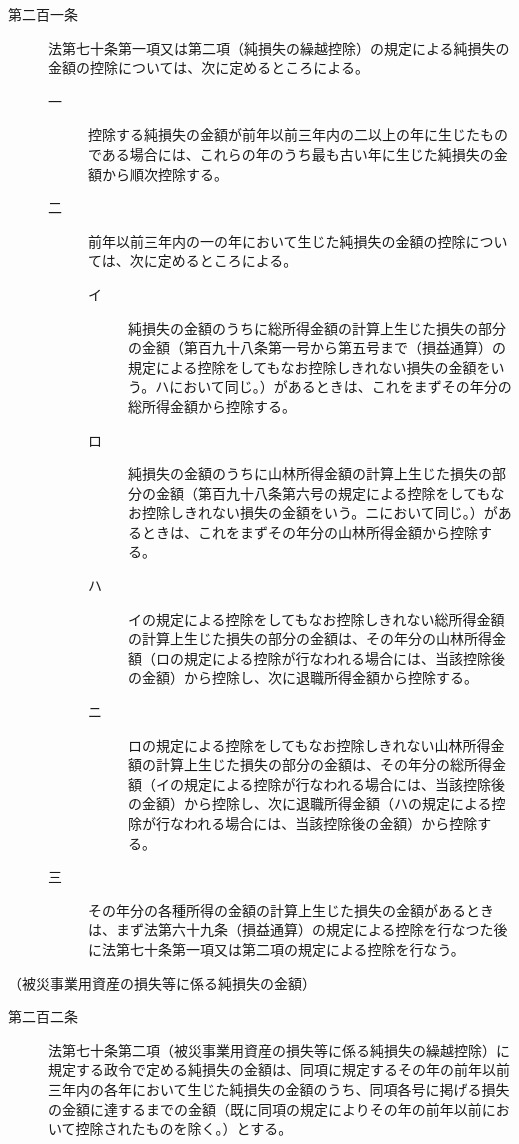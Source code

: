 \documentclass[twocolumn,a4j,10pt]{ltjtarticle}
\begin{document}
\begin{description}
\item[第二百一条]法第七十条第一項又は第二項（純損失の繰越控除）の規定による純損失の金額の控除については、次に定めるところによる。
\begin{description}
\item[一]控除する純損失の金額が前年以前三年内の二以上の年に生じたものである場合には、これらの年のうち最も古い年に生じた純損失の金額から順次控除する。
\item[二]前年以前三年内の一の年において生じた純損失の金額の控除については、次に定めるところによる。
\begin{description}
\item[イ]純損失の金額のうちに総所得金額の計算上生じた損失の部分の金額（第百九十八条第一号から第五号まで（損益通算）の規定による控除をしてもなお控除しきれない損失の金額をいう。ハにおいて同じ。）があるときは、これをまずその年分の総所得金額から控除する。
\item[ロ]純損失の金額のうちに山林所得金額の計算上生じた損失の部分の金額（第百九十八条第六号の規定による控除をしてもなお控除しきれない損失の金額をいう。ニにおいて同じ。）があるときは、これをまずその年分の山林所得金額から控除する。
\item[ハ]イの規定による控除をしてもなお控除しきれない総所得金額の計算上生じた損失の部分の金額は、その年分の山林所得金額（ロの規定による控除が行なわれる場合には、当該控除後の金額）から控除し、次に退職所得金額から控除する。
\item[ニ]ロの規定による控除をしてもなお控除しきれない山林所得金額の計算上生じた損失の部分の金額は、その年分の総所得金額（イの規定による控除が行なわれる場合には、当該控除後の金額）から控除し、次に退職所得金額（ハの規定による控除が行なわれる場合には、当該控除後の金額）から控除する。
\end{description}
\item[三]その年分の各種所得の金額の計算上生じた損失の金額があるときは、まず法第六十九条（損益通算）の規定による控除を行なつた後に法第七十条第一項又は第二項の規定による控除を行なう。
\end{description}
\end{description}
\noindent\hspace{10pt}（被災事業用資産の損失等に係る純損失の金額）
\begin{description}
\item[第二百二条]法第七十条第二項（被災事業用資産の損失等に係る純損失の繰越控除）に規定する政令で定める純損失の金額は、同項に規定するその年の前年以前三年内の各年において生じた純損失の金額のうち、同項各号に掲げる損失の金額に達するまでの金額（既に同項の規定によりその年の前年以前において控除されたものを除く。）とする。
\end{description}
\end{document}
